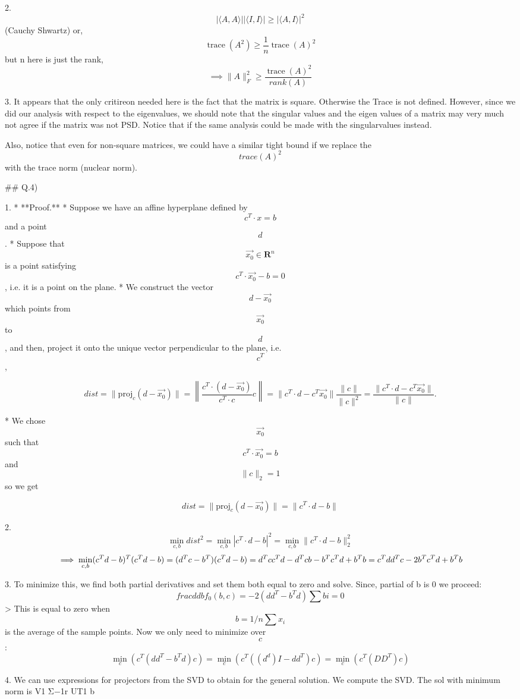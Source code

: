 2.  
    $$
    |\langle A,A\rangle| |\langle I,I\rangle| \ge |\langle A,I\rangle|^2$$ (Cauchy Shwartz) or,  
    $$\operatorname{trace}(A^2)\ge\frac{1}{n}\operatorname{trace}(A)^2$$ but n here is just the rank,  
    $$\implies\|A\|_F^2\ge\frac{\operatorname{trace}(A)^2}{rank(A)}$$

3. It appears that the only critireon needed here is the fact that the matrix is square. Otherwise the Trace is not defined. 
    However, since we did our analysis with respect to the eigenvalues, we should note that the singular values and the eigen values of a matrix may very much not agree if the matrix was not PSD.
    Notice that if the same analysis could be made with the singularvalues instead.  

    Also, notice that even for non-square matrices, we could have a similar tight bound if we replace the $$trace(A)^2$$ with the trace norm (nuclear norm).


## Q.4)

1. 
    * **Proof.**  
        * Suppose we have an affine hyperplane defined by $$c^T \cdot x = b$$ and a point $$d$$.
        * Suppose that $$\vec{x_0} \in \mathbf{R}^n$$ is a point satisfying $$c^T \cdot \vec{x_0} - b = 0$$, i.e. it is a point on the plane.
        * We construct the vector $$d−\vec{x_0}$$ which points from $$\vec{x_0}$$ to $$d$$, and then, project it onto the unique vector perpendicular to the plane, i.e. $$c^T$$,  

            $$dist=\| \text{proj}_{c} (d-\vec{x_0})\| = \left\| \frac{c^T\cdot(d-\vec{x_0}) }{c^T \cdot c} c \right\| = \|c^T \cdot d - c^T\vec{x_0}\|\frac{\|c\|}{\|c\|^2} = \frac{\|c^T \cdot d - c^T\vec{x_0}\|}{\|c\|}.$$

        * We chose $$\vec{x_0}$$ such that $$c^T\cdot \vec{x_0} = b$$ and $$\|c\|_2=1$$ so we get  

            $$dist=\| \text{proj}_{c} (d-\vec{x_0})\| = \|c^T \cdot d - b\|$$

2. 
    $$\min_{c,b} dist^2 = \min_{c,b} |c^T \cdot d - b|^2 = \min_{c,b} \|c^T \cdot d - b\|_2^2$$
    $$\implies \min_{c,b} (c^Td-b)^T(c^Td-b) = (d^Tc-b^T)(c^Td-b)=d^Tcc^Td-d^Tcb-b^Tc^Td+b^Tb \\= c^Tdd^Tc-2b^Tc^Td+b^Tb$$

3. To minimize this, we find both partial derivatives and set them both equal to zero and solve.
    Since, partial of b is 0 we proceed:  
    $$frac{d}{db} f_0(b,c) = -2 (dd^T-b^Td) \sum bi = 0$$  
    > This is equal to zero when $$b = 1/n \sum x_i$$ is the average of the sample points.  
    Now we only need to minimize over $$c$$:  
    $$\min_c (c^T(dd^T-b^Td)c) = \min_c (c^T((d^d)I-dd^T)c) = \min_c (c^T(DD^T)c)$$  

4. We can use expressions for projectors from the SVD to obtain for the general solution.
    We compute the SVD.
    The sol with minimum norm is V1 Σ−1r UT1 b